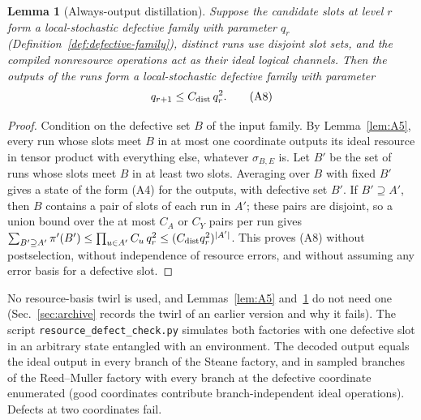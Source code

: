 \documentclass[aps,prx,reprint,superscriptaddress,nofootinbib,floatfix,longbibliography]{revtex4-2}
\newtheorem{lemma}[theorem]{Lemma}
\theoremstyle{definition}
\begin{document}
\begin{lemma}[Always-output distillation]\label{lem:A7}
Suppose the candidate slots at level $r$ form a local-stochastic defective
family with parameter $q_r$ (Definition~\ref{def:defective-family}), distinct
runs use disjoint slot sets, and the compiled nonresource operations act as
their ideal logical channels.  Then the outputs of the runs form a
local-stochastic defective family with parameter
\begin{equation}
 q_{r+1}\leq C_{\rm dist}\,q_r^2.                                 \tag{A8}
\end{equation}
\end{lemma}
\begin{proof}
Condition on the defective set $B$ of the input family.  By
Lemma~\ref{lem:A5}, every run whose slots meet $B$ in at most one coordinate
outputs its ideal resource in tensor product with everything else, whatever
$\sigma_{B,E}$ is.  Let $B'$ be the set of runs whose slots meet $B$ in at
least two slots.  Averaging over $B$ with fixed $B'$ gives a state of the
form (A4) for the outputs, with defective set $B'$.  If $B'\supseteq A'$,
then $B$ contains a pair of slots of each run in $A'$; these pairs are
disjoint, so a union bound over the at most $C_A$ or $C_Y$ pairs per run gives
$\sum_{B'\supseteq A'}\pi'(B')\le\prod_{u\in A'}C_u\,q_r^{2}\le
(C_{\rm dist}q_r^2)^{|A'|}$.  This proves (A8) without postselection, without
independence of resource errors, and without assuming any error basis for a
defective slot.
\end{proof}

No resource-basis twirl is used, and Lemmas~\ref{lem:A5} and~\ref{lem:A7} do
not need one (Sec.~\ref{sec:archive} records the twirl of an earlier version
and why it fails).  The script \texttt{resource\_defect\_check.py} simulates
both factories with one defective slot in an arbitrary state entangled with
an environment.  The decoded output equals the ideal output in every branch
of the Steane factory, and in sampled branches of the Reed--Muller factory
with every branch at the defective coordinate enumerated (good coordinates
contribute branch-independent ideal operations).  Defects at two coordinates
fail.
\end{document}
